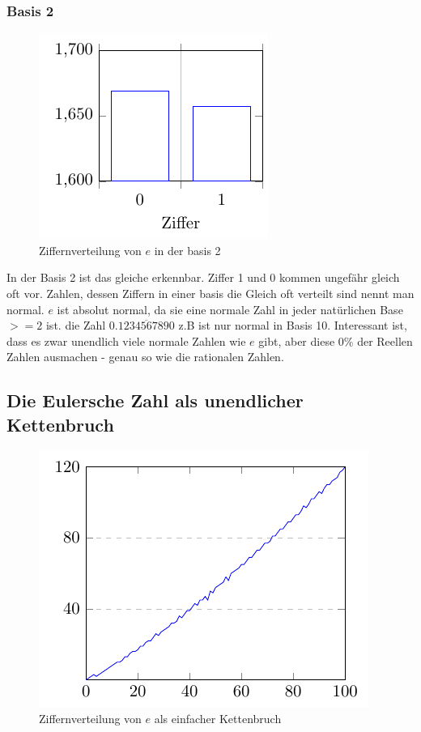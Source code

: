 \subsubsection{Basis 2}
\begin{figure}[h]
  \includegraphics{medien2/basis2/basis2.pdf}
  \centering
  \caption{Ziffernverteilung von $e$ in der basis 2}
\end{figure}
In der Basis 2 ist das gleiche erkennbar. Ziffer 1 und 0 kommen ungefähr gleich oft vor. 
Zahlen, dessen Ziffern in einer basis die Gleich oft verteilt sind nennt man normal. $e$ ist absolut normal, da sie eine normale Zahl in jeder natürlichen Base $>= 2$ ist. die Zahl $0.\overline{1234567890}$ z.B ist nur normal in Basis 10. Interessant ist, dass es zwar unendlich viele normale Zahlen wie $e$ gibt, aber diese 0\% der Reellen Zahlen ausmachen - genau so wie die rationalen Zahlen.
\subsection{Die Eulersche Zahl als unendlicher Kettenbruch}
\begin{figure}[h]
  \includegraphics{medien2/kettenbruch/kettenbruch.pdf}
  \centering
  \caption{Ziffernverteilung von $e$ als einfacher Kettenbruch}
\end{figure}
